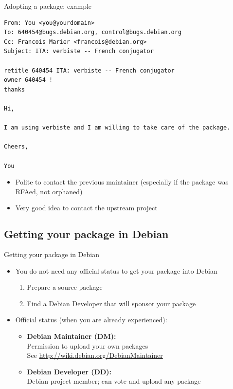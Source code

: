 \documentclass[10pt,final]{beamer}
\begin{document}
\begin{frame}[fragile]{Adopting a package: example}
\begin{lstlisting}[basicstyle=\ttfamily\footnotesize]
From: You <you@yourdomain>
To: 640454@bugs.debian.org, control@bugs.debian.org
Cc: Francois Marier <francois@debian.org>
Subject: ITA: verbiste -- French conjugator

retitle 640454 ITA: verbiste -- French conjugator
owner 640454 !
thanks

Hi,

I am using verbiste and I am willing to take care of the package.

Cheers,

You
\end{lstlisting}

\begin{itemize}
\item Polite to contact the previous maintainer (especially if the package was RFAed, not orphaned)
\item Very good idea to contact the upstream project
\end{itemize}
\end{frame}

\subsection{Getting your package in Debian}
\begin{frame}{Getting your package in Debian}
\begin{itemize}
\item You do not need any official status to get your package into Debian
	\begin{enumerate}
		\item Prepare a source package
			\hbr
		\item Find a Debian Developer that will sponsor your package
	\end{enumerate}
\br
\item Official status (when you are already experienced):
	\begin{itemize}
		\item \textbf{Debian Maintainer (DM):}\\
			Permission to upload your own packages\\
			See \url{http://wiki.debian.org/DebianMaintainer}
			\hbr
		\item \textbf{Debian Developer (DD):}\\
			Debian project member; can vote and upload any package
	\end{itemize}
\end{itemize}
\end{frame}
\end{document}
